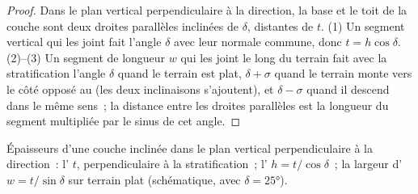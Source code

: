 \begin{proof}
Dans le plan vertical perpendiculaire à la direction, la base et le toit de la
couche sont deux droites parallèles inclinées de $\delta$, distantes de $t$.
(1) Un segment vertical qui les joint fait l'angle $\delta$ avec leur normale
commune, donc $t = h\cos\delta$. (2)--(3) Un segment de longueur $w$ qui les
joint le long du terrain fait avec la stratification l'angle $\delta$ quand le
terrain est plat, $\delta + \sigma$ quand le terrain monte vers le côté opposé au
 (les deux inclinaisons s'ajoutent), et $\delta - \sigma$ quand
il descend dans le même sens~; la distance entre les droites parallèles est la
longueur du segment multipliée par le sinus de cet angle.
\end{proof}

\begin{omfigure}

{\small Épaisseurs d'une couche inclinée dans le plan vertical perpendiculaire à
la direction~: l' $t$, perpendiculaire à la stratification~;
l' $h = t/\cos\delta$~; la largeur d'
$w = t/\sin\delta$ sur terrain plat (schématique, avec $\delta = \ang{25}$).}
\end{omfigure}

